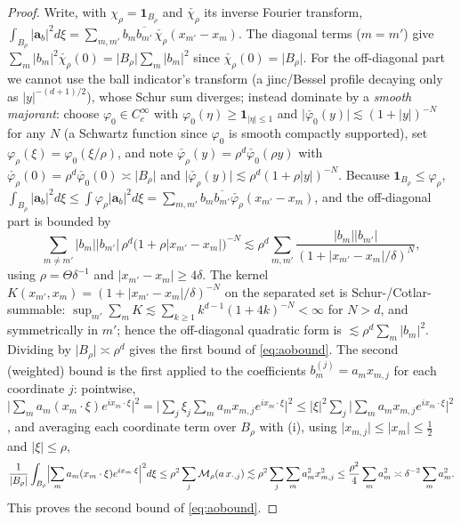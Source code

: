 \documentclass[11pt]{article}
\theoremstyle{remark}
\newcommand{\one}{\mathbf{1}}
\newcommand{\abs}[1]{\lvert #1\rvert}
\newcommand{\checkK}[1]{\check{#1}}
\begin{document}
\begin{proof}
Write, with $\chi_\rho=\one_{B_\rho}$ and
$\checkK{\chi_\rho}$ its inverse Fourier transform,
$\int_{B_\rho}\abs{\mathbf a_b}^{2}d\xi
=\sum_{m,m'}b_m\overline{b_{m'}}\,\checkK{\chi_\rho}(x_{m'}-x_m)$. The
diagonal terms ($m=m'$) give
$\sum_m\abs{b_m}^2\checkK{\chi_\rho}(0)=\abs{B_\rho}\sum_m\abs{b_m}^2$
since $\checkK{\chi_\rho}(0)=\abs{B_\rho}$. For the off-diagonal part we
cannot use the ball indicator's transform (a jinc/Bessel profile decaying
only as $|y|^{-(d+1)/2}$), whose Schur sum diverges; instead dominate by a
\emph{smooth majorant}: choose $\varphi_0\in C_c^\infty$ with
$\varphi_0(\eta)\ge\one_{|\eta|\le1}$ and
$\abs{\checkK{\varphi_0}(y)}\lesssim(1+\abs y)^{-N}$ for any $N$ (a
Schwartz function since $\varphi_0$ is smooth compactly supported), set
$\varphi_\rho(\xi)=\varphi_0(\xi/\rho)$, and note
$\checkK{\varphi_\rho}(y)=\rho^{d}\checkK{\varphi_0}(\rho y)$ with
$\checkK{\varphi_\rho}(0)=\rho^{d}\checkK{\varphi_0}(0)\asymp\abs{B_\rho}$
and $\abs{\checkK{\varphi_\rho}(y)}\lesssim\rho^{d}(1+\rho\abs{y})^{-N}$.
Because $\one_{B_\rho}\le\varphi_\rho$,
$\int_{B_\rho}\abs{\mathbf a_b}^{2}d\xi
\le\int\varphi_\rho\abs{\mathbf a_b}^{2}d\xi
=\sum_{m,m'}b_m\overline{b_{m'}}\checkK{\varphi_\rho}(x_{m'}-x_m)$, and the
off-diagonal part is bounded by
\[
\sum_{m\ne m'}\abs{b_m}\abs{b_{m'}}\,\rho^{d}
\bigl(1+\rho\abs{x_{m'}-x_m}\bigr)^{-N}
\lesssim\rho^{d}\sum_{m,m'}\frac{\abs{b_m}\abs{b_{m'}}}
{(1+\abs{x_{m'}-x_m}/\delta)^{N}},
\]
using $\rho= \Theta\delta^{-1}$ and $\abs{x_{m'}-x_m}\ge4\delta$. The kernel
$K(x_{m'},x_m)=(1+\abs{x_{m'}-x_m}/\delta)^{-N}$ on the separated set is
Schur-/Cotlar-summable: $\sup_{m'}\sum_m K\lesssim\sum_{k\ge1}k^{d-1}
(1+4k)^{-N}<\infty$ for $N>d$, and symmetrically in $m'$; hence the
off-diagonal quadratic form is $\lesssim\rho^{d}\sum_m\abs{b_m}^{2}$.
Dividing by $\abs{B_\rho}\asymp\rho^{d}$ gives the first bound of
\eqref{eq:aobound}. The second (weighted) bound is the first applied to the
coefficients $b_m^{(j)}=a_m x_{m,j}$ for each coordinate $j$: pointwise,
$\abs{\sum_m a_m(x_m\cdot\xi)e^{ix_m\cdot\xi}}^{2}
=\abs{\sum_j\xi_j\sum_m a_m x_{m,j}e^{ix_m\cdot\xi}}^{2}
\le\abs{\xi}^{2}\sum_j\abs{\sum_m a_m x_{m,j}e^{ix_m\cdot\xi}}^{2}$, and
averaging each coordinate term over $B_\rho$ with (i), using
$\abs{x_{m,j}}\le\abs{x_m}\le\tfrac12$ and $\abs\xi\le\rho$,
\[
\frac{1}{\abs{B_\rho}}\int_{B_\rho}
\Bigl|\sum_m a_m(x_m\cdot\xi)e^{ix_m\cdot\xi}\Bigr|^{2}d\xi
\le\rho^{2}\sum_j\mathcal M_\rho(a\,x_{\cdot,j})
\lesssim\rho^{2}\sum_j\sum_m a_m^{2}x_{m,j}^{2}
\le\frac{\rho^{2}}{4}\sum_m a_m^{2}
\asymp\delta^{-2}\sum_m a_m^{2}.
\]
This proves the second bound of \eqref{eq:aobound}.
\end{proof}
\end{document}
